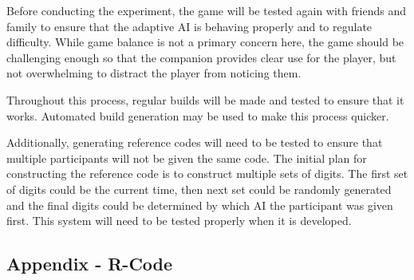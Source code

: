 \documentclass{IEEEtran}
\begin{document}
Before conducting the experiment, the game will be tested again with friends and family to ensure that the adaptive AI is behaving properly and to regulate difficulty. While game balance is not a primary concern here, the game should be challenging enough so that the companion provides clear use for the player, but not overwhelming to distract the player from noticing them.

Throughout this process, regular builds will be made and tested to ensure that it works. Automated build generation may be used to make this process quicker.

Additionally, generating reference codes will need to be tested to ensure that multiple participants will not be given the same code. The initial plan for constructing the reference code is to construct multiple sets of digits. The first set of digits could be the current time, then next set could be randomly generated and the final digits could be determined by which AI the participant was given first. This system will need to be tested properly when it is developed.

\newpage

\subsection{Appendix - R-Code}
\label{AppendixRCode}

\end{document}
